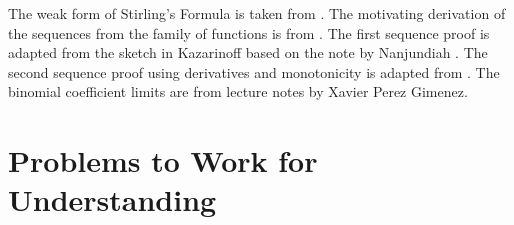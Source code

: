 \documentclass[12pt]{article}
\begin{document}
The weak form of Stirling's Formula is taken from
\cite{saks71}.  The motivating derivation of the sequences from the
family of functions is from
\cite{hammett20}.  The first sequence proof is adapted from the sketch
in Kazarinoff
\cite{kazarinoff61} based on the note by Nanjundiah
\cite{nanjundiah59}.  The second sequence proof using derivatives and
monotonicity is adapted from
\cite{dutkay13}.  The binomial coefficient limits are from lecture notes
by Xavier Perez Gimenez.

\hr

\section*{Problems to Work for Understanding}

\renewcommand{\theexerciseseries}{}
\renewcommand{\theexercise}{\arabic{exercise}}
\end{document}
